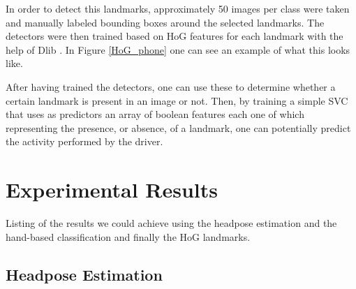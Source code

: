 \documentclass[10pt,twocolumn,letterpaper]{article}
\begin{document}
In order to detect this landmarks, approximately 50 images per class were taken and manually labeled bounding boxes around the selected landmarks. The detectors were then trained based on HoG features for each landmark with the help of Dlib \cite{dlib09}. In Figure \ref{HoG_phone} one can see an example of what this looks like.

After having trained the detectors, one can use these to determine whether a certain landmark is present in an image or not. Then, by training a simple SVC that uses as predictors an array of boolean features each one of which representing the presence, or absence, of a landmark, one can potentially predict the activity performed by the driver.



 










\section{Experimental Results}
Listing of the results we could achieve using the headpose estimation and the hand-based classification and finally the HoG landmarks.
\subsection{Headpose Estimation}
\end{document}
